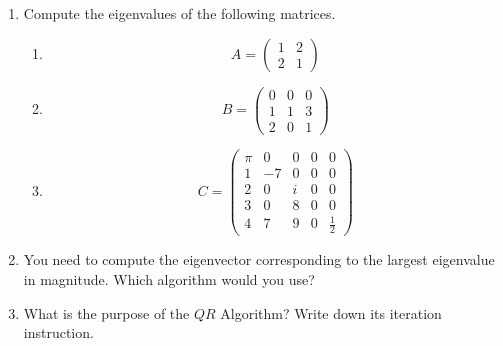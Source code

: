 \vspace*{-0.5cm}
\begin{enumerate}
\item Compute the eigenvalues of the following matrices.

\begin{enumerate}
	\item 
	$$
	A = \begin{pmatrix}
	1&2\\
	2&1
	\end{pmatrix}
	$$
	\item
	$$
	B = \begin{pmatrix}
	0&0&0\\
	1&1&3\\
	2&0&1
	\end{pmatrix}
	$$
	\item 
	$$C=
	\begin{pmatrix}
	\pi& 0& 0& 0 &0\\
	1 & -7&  0& 0 &0\\
	2 & 0& i  & 0 &0\\
	3 & 0& 8  & 0 & 0\\
	4 & 7& 9& 0& \frac{1}{2}
	\end{pmatrix}
	$$
\end{enumerate}
\item You need to compute the eigenvector corresponding to the largest eigenvalue in magnitude. Which algorithm would you use?
\item What is the purpose of the $QR$ Algorithm? Write down its iteration instruction.
%
%

\end{enumerate}
